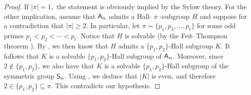 \documentclass[12pt]{amsart}
\theoremstyle{definition}
\numberwithin{equation}{section}
\newcommand{\Al}{\textup{\textsf{A}}}
\newcommand{\Sy}{\textup{\textsf{S}}}
\begin{document}
\begin{proof}
If $|\pi|=1,$ the statement is obviously implied by the Sylow theory.
For the other %
implication, assume that $\Al_n$ admits %
a Hall-
$\pi$%
-subgroup $H$ and suppose for a contradiction that $|\pi|\geq
2$. %
In particular, let %
$\pi=\{p_1,p_2,\ldots, p_t\}$ for some odd
primes $p_1<p_2<\cdots<p_t$. %
Notice that $H$ is solvable (by the Feit--Thompson theorem
\cite{Thompson63}). By \cite{Hall1}, we then know that $H$ admits a
$\{p_1,p_2\}$-Hall subgroup $K$. It follows that $K$ %
is a solvable
$\{p_1,p_2\}$-Hall subgroup of $\Al_n$. Moreover, %
since $2\notin
\{p_1,p_2\}$, we %
also have that $K$ is a solvable $\{p_1,p_2\}$-Hall
subgroup of the symmetric group $\Sy_n$. Using \cite[Theorem
A4]{Hall2}, we deduce that $|K|$ is even, and therefore $2\in
\{p_1,p_2\}\subseteq \pi$. %
This  contradicts %
our hypothesis.
%
%
\end{proof}
\end{document}
